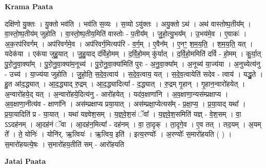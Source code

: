 \documentclass[17pt]{extarticle}
\begin{document}
\textbf{Krama Paata} \newline

दक्षि॑णो यु॒क्तः । यु॒क्तो भव॑ति । भव॑ति स॒व्यः । स॒व्यो ऽयु॑क्तः । अयु॒क्तो ऽथ॑ । अथ॑ वास्तोष्प॒तीय᳚म् । वा॒स्तो॒ष्प॒तीय॑म् जुहोति । वा॒स्तो॒ष्प॒तीय॒मिति॑ वास्तोः - प॒तीय᳚म् । जु॒हो॒त्यु॒भय᳚म् । उ॒भय॑मे॒व । ए॒वाकः॑ । अ॒क॒रप॑रिवर्गम् । अप॑रिवर्गमे॒व । अप॑रिवर्ग॒मित्यप॑रि - व॒र्ग॒म् । ए॒वैन᳚म् । ए॒नꣳ॒॒ श॒म॒य॒ति॒ । श॒म॒य॒ति॒ यत् । यदेक॑या । एक॑या जुहु॒यात् । जु॒हु॒याद् द॑र्विहो॒मम् । द॒र्वि॒हो॒मम् कु॑र्यात् । द॒र्वि॒हो॒ममिति॑ दर्वि - हो॒मम् । कु॒र्या॒त् पु॒रो॒नु॒वा॒क्या᳚म् । पु॒रो॒नु॒वा॒क्या॑म॒नूच्य॑ । पु॒रो॒नु॒वा॒क्या॑मिति॑ पुरः - अ॒नु॒वा॒क्या᳚म् । अ॒नूच्य॑ या॒ज्य॑या । अ॒नुच्येत्य॑नु - उच्य॑ । या॒ज्य॑या जुहोति । जु॒हो॒ति॒ स॒दे॒व॒त्वाय॑ । स॒दे॒व॒त्वाय॒ यत् । स॒दे॒व॒त्वायेति॑ सदेव - त्वाय॑ । यद्धु॒ते । हु॒त आ॑द॒द्ध्यात् । आ॒द॒द्ध्याद् रु॒द्रम् । आ॒द॒द्ध्यादित्या᳚ - द॒द्ध्यात् । रु॒द्रम् गृ॒हान् । गृ॒हान॒न्वारो॑हयेत् । अ॒न्वारो॑हये॒द् यत् । अ॒न्वारो॑हये॒दित्य॑नु - आरो॑हयेत् । यद॑व॒क्षाणा॑नि । अ॒व॒क्षाणा॒न्यस॑म्प्रक्षाप्य । अ॒व॒क्षाणा॒नीत्य॑व - क्षाणा॑नि । अस॑म्प्रक्षाप्य प्रया॒यात् । अस॑म्प्रक्षा॒प्येत्यस᳚म् - प्र॒क्षा॒प्य॒ । प्र॒या॒याद् यथा᳚ । प्र॒या॒यादिति॑ प्र - या॒यात् । यथा॑ यज्ञ्वेश॒सम् । य॒ज्ञ्॒वे॒श॒सं ॅवा᳚ । य॒ज्ञ्॒वे॒श॒समिति॑ यज्ञ् - वे॒श॒सम् । वा॒ ऽऽदह॑नम् । आ॒दह॑नं ॅवा । आ॒दह॑न॒मित्या᳚ - दह॑नम् । वा॒ ता॒दृक् । ता॒दृगे॒व । ए॒व तत् । तद॒यम् । अ॒यम् ते᳚ । ते॒ योनिः॑ । योनि॑र्. ऋ॒त्वियः॑ । ऋ॒त्विय॒ इति॑ । इत्य॒रण्योः᳚ । अ॒रण्योः᳚ स॒मारो॑हयति ( ) । स॒मारो॑हयत्ये॒षः । स॒मारो॑हय॒तीति॑ सम् - आरो॑हयति \newline

\textbf{Jatai Paata} \newline
\end{document}
